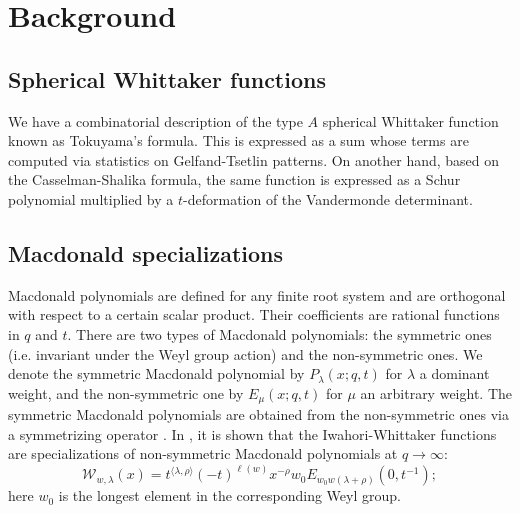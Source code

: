 \documentclass[11pt]{amsart}
\begin{document}
{\section{Background}
\subsection{Spherical Whittaker functions}
\indent We have a combinatorial description of the type $A$ spherical Whittaker function known as Tokuyama's formula. This is expressed as a sum whose terms are computed via statistics on Gelfand-Tsetlin patterns. On another hand, based on the Casselman-Shalika formula, the same function is expressed as a Schur polynomial multiplied by a $t$-deformation of the Vandermonde determinant.
\subsection{Macdonald specializations} 
Macdonald polynomials are defined for any finite root system and are orthogonal with respect to a certain scalar product. Their coefficients are rational functions in $q$ and $t$. There are two types of Macdonald polynomials: the symmetric ones (i.e. invariant under the Weyl group action) and the non-symmetric ones. We denote the symmetric Macdonald polynomial by $P_{\lambda}(x;q,t)$ for $\lambda$ a dominant weight, and the non-symmetric one by $E_{\mu}(x;q,t)$ for $\mu$ an arbitrary weight. The symmetric Macdonald polynomials are obtained from the non-symmetric ones via a symmetrizing operator \cite[Chapter 5]{IG1}. %
\newline\indent In \cite{BBL}, it is shown that the Iwahori-Whittaker functions are specializations of non-symmetric Macdonald polynomials at $q\rightarrow \infty$:
\[
\mathcal{W}_{w,\lambda}(x)%
=t^{\langle\lambda,\rho\rangle}(-t)^{\ell(w)}x^{-\rho}w_{0}E_{w_{0}w(\lambda+\rho)}(0,t^{-1});
\]
here $w_{0}$ is the longest element in the corresponding Weyl group. 
}
\end{document}
